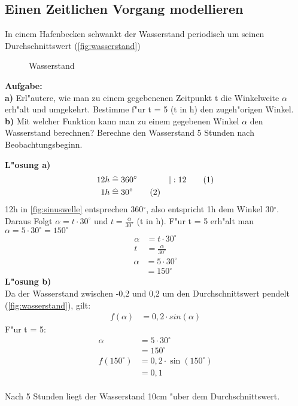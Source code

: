 \documentclass{standalone}
\begin{document}
\subsection{Einen Zeitlichen Vorgang modellieren}

\noindent In einem Hafenbecken schwankt der Wasserstand periodisch um seinen Durchschnittswert (\autoref{fig:wasserstand})

\begin{figure}[hb!]
  \center
  \def\svgwidth{500px}
  
  \caption{Wasserstand}
  \label{fig:wasserstand}
\end{figure}

\noindent \textbf{Aufgabe:}\\
\noindent \textbf{a)} Erl{"a}utere, wie man zu einem gegebenenen Zeitpunkt t die Winkelweite $\alpha$ erh{"a}lt und umgekehrt. Bestimme f{"u}r t = 5 (t in h) den zugeh{"o}rigen Winkel.\\
\noindent \textbf{b)} Mit welcher Funktion kann man zu einem gegebenen Winkel $\alpha$ den Wasserstand berechnen? Berechne den Wasserstand 5 Stunden nach Beobachtungsbeginn.\\

\newpage

\noindent \textbf{L{"o}sung a)}
\begin{align}
  12h & \equalhat 360^\circ        & |:12\tag{1} \\
  1h  & \equalhat 30^\circ \tag{2}
\end{align}
\noindent 12h in {\autoref{fig:sinuswelle}} entsprechen 360$^\circ$, also entspricht 1h dem Winkel 30$^\circ$.\\
Daraus Folgt $\alpha = t \cdot 30^\circ$ und $t = \frac{\alpha}{30^\circ}$ (t in h). F{"u}r t = 5 erh{"a}lt man $\alpha = 5 \cdot 30^\circ = 150^\circ$
\begin{align}
  \alpha & = t \cdot 30^\circ     \nonumber      \\
  t      & = \frac{\alpha}{30^\circ}   \nonumber
\end{align}
\begin{align}
  \alpha & = 5 \cdot 30^\circ \tag{1} \\ & = 150^\circ \tag{2}
\end{align}
\noindent \textbf{L{"o}sung b)}\\
Da der Wasserstand zwischen -0,2 und 0,2 um den Durchschnittswert pendelt (\autoref{fig:wasserstand}), gilt:
\begin{align}
  f(\alpha) & = 0,2 \cdot sin(\alpha)     \nonumber
\end{align}
\noindent F{"u}r t = 5:
\begin{align}
  \alpha       & = 5 \cdot 30^\circ     \tag{1}      \\
               & = 150^\circ   \tag{2}               \\
  f(150^\circ) & = 0,2 \cdot \sin(150^\circ) \tag{3} \\
               & = 0,1 \tag{4}
\end{align}\\
\noindent Nach 5 Stunden liegt der Wasserstand 10cm {"u}ber dem Durchschnittswert.
\end{document}
